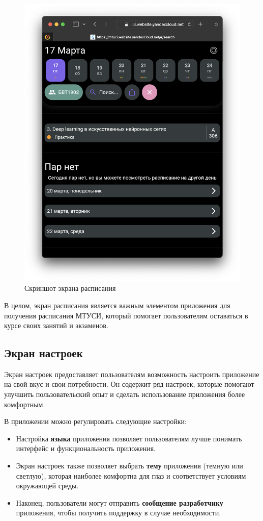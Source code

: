\begin{figure}[h]
\centering
\includegraphics[width=0.8\linewidth]{images/rasp_screen.png}
\caption{Скриншот экрана расписания}
\label{fig:mpr}
\end{figure}

В целом, экран расписания является важным элементом приложения
для получения расписания МТУСИ, который помогает пользователям оставаться
в курсе своих занятий и экзаменов.

\subsection{Экран настроек}
Экран настроек предоставляет пользователям возможность настроить
приложение на свой вкус и свои потребности.
Он содержит ряд настроек, которые помогают улучшить
пользовательский опыт и сделать использование приложения более комфортным.

В приложении можно регулировать следующие настройки:
\begin{itemize}
    \item Настройка \textbf{языка} приложения позволяет пользователям лучше понимать интерфейс и функциональность приложения.
    \item Экран настроек также позволяет выбрать \textbf{тему} приложения (темную или светлую),
    которая наиболее комфортна для глаз и соответствует условиям окружающей среды. 
    \item Наконец, пользователи могут отправить \textbf{сообщение разработчику} приложения,
    чтобы получить поддержку в случае необходимости.
\end{itemize}

